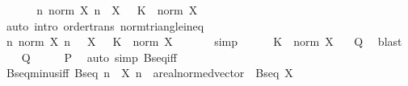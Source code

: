 \begin{isabellebody}
\ \ \isamarkupfalse%
\ {\isacharasterisk}{\kern0pt}{\isacharasterisk}{\kern0pt}\ \isamarkupfalse%
\ {\isachardoublequoteopen}{\isasymforall}n{\isachardot}{\kern0pt}\ norm\ {\isacharparenleft}{\kern0pt}X\ n\ {\isacharminus}{\kern0pt}\ X\ {}{\isacharparenright}{\kern0pt}\ {\isasymle}\ K\ {\isacharplus}{\kern0pt}\ norm\ {\isacharparenleft}{\kern0pt}X\ {}{\isacharparenright}{\kern0pt}{\isachardoublequoteclose}\isanewline
\ \ \ \ \isamarkupfalse%
\ {\isacharparenleft}{\kern0pt}auto\ intro{\isacharcolon}{\kern0pt}\ order{\isacharunderscore}{\kern0pt}trans\ norm{\isacharunderscore}{\kern0pt}triangle{\isacharunderscore}{\kern0pt}ineq{}{\isacharparenright}{\kern0pt}\isanewline
\ \ \isamarkupfalse%
\ \isamarkupfalse%
\ {\isachardoublequoteopen}{\isasymforall}n{\isachardot}{\kern0pt}\ norm\ {\isacharparenleft}{\kern0pt}X\ n\ {\isacharplus}{\kern0pt}\ {\isacharminus}{\kern0pt}\ X\ {}{\isacharparenright}{\kern0pt}\ {\isasymle}\ K\ {\isacharplus}{\kern0pt}\ norm\ {\isacharparenleft}{\kern0pt}X\ {}{\isacharparenright}{\kern0pt}{\isachardoublequoteclose}\isanewline
\ \ \ \ \isamarkupfalse%
\ simp\isanewline
\ \ \isamarkupfalse%
\ {\isacartoucheopen}{}\ {\isacharless}{\kern0pt}\ K\ {\isacharplus}{\kern0pt}\ norm\ {\isacharparenleft}{\kern0pt}X\ {}{\isacharparenright}{\kern0pt}{\isacartoucheclose}\ \isamarkupfalse%
\ {\isacharquery}{\kern0pt}Q\ \isamarkupfalse%
\ blast\isanewline
{}\isamarkupfalse%
\isanewline
\ \ \isamarkupfalse%
\ {\isacharquery}{\kern0pt}Q\isanewline
\ \ \isamarkupfalse%
\ \isamarkupfalse%
\ {\isacharquery}{\kern0pt}P\ \isamarkupfalse%
\ {\isacharparenleft}{\kern0pt}auto\ simp{\isacharcolon}{\kern0pt}\ Bseq{\isacharunderscore}{\kern0pt}iff{}{\isacharparenright}{\kern0pt}\isanewline
{}\isamarkupfalse%
%
\endisatagproof
{\isafoldproof}%
%
\isadelimproof
%
\endisadelimproof
%
\isadelimdocument
%
\endisadelimdocument
%
\isatagdocument
%
\isamarkuptrue%
%
\endisatagdocument
{\isafolddocument}%
%
\isadelimdocument
%
\endisadelimdocument
{}\isamarkupfalse%
\ Bseq{\isacharunderscore}{\kern0pt}minus{\isacharunderscore}{\kern0pt}iff{\isacharcolon}{\kern0pt}\ {\isachardoublequoteopen}Bseq\ {\isacharparenleft}{\kern0pt}{\isasymlambda}n{\isachardot}{\kern0pt}\ {\isacharminus}{\kern0pt}\ {\isacharparenleft}{\kern0pt}X\ n{\isacharparenright}{\kern0pt}\ {\isacharcolon}{\kern0pt}{\isacharcolon}{\kern0pt}\ {\isacharprime}{\kern0pt}a{\isacharcolon}{\kern0pt}{\isacharcolon}{\kern0pt}real{\isacharunderscore}{\kern0pt}normed{\isacharunderscore}{\kern0pt}vector{\isacharparenright}{\kern0pt}\ {\isasymlongleftrightarrow}\ Bseq\ X{\isachardoublequoteclose}\isanewline

\end{isabellebody}
